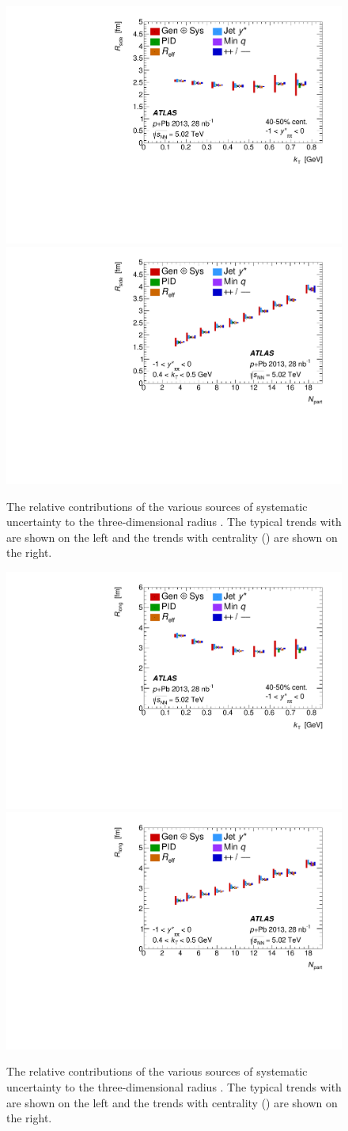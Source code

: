 \begin{figure}[t]
\centering
\includegraphics[width=0.49\linewidth]{canqosl_Rside_vs_kt_systs.pdf}
\includegraphics[width=0.49\linewidth]{canqosl_Rside_vs_npart_systs.pdf}\\
\caption{The relative contributions of the various sources of systematic uncertainty to the three-dimensional radius \Rside. The typical trends with \kt are shown on the left and the trends with centrality (\Npart) are shown on the right.}
\label{fig:syst_rside}
\end{figure}

\begin{figure}[t]
\centering
\includegraphics[width=0.49\linewidth]{canqosl_Rlong_vs_kt_systs.pdf}
\includegraphics[width=0.49\linewidth]{canqosl_Rlong_vs_npart_systs.pdf}\\
\caption{The relative contributions of the various sources of systematic uncertainty to the three-dimensional radius \Rlong. The typical trends with \kt are shown on the left and the trends with centrality (\Npart) are shown on the right.}
\label{fig:syst_rlong}
\end{figure}

